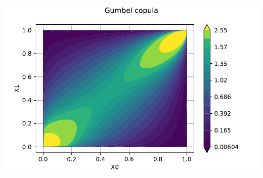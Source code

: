 \documentclass{beamer}
\begin{document}
\begin{frame}[containsverbatim]
\begin{minipage}[t]{0.5\textwidth}
\end{minipage}%
\begin{minipage}[t]{0.5\textwidth}
    \includegraphics[width=.85\textwidth]{figures/Copula4.pdf}

\end{minipage}

\end{frame}


\end{document}
